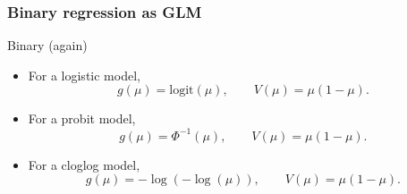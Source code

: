 \documentclass[handout]{beamer}
\newcommand{\logit}{\text{logit}}
\begin{document}

   \begin{frame} \frametitle{Binary regression as GLM}

   \begin{block}
      {Binary (again)}
      \begin{itemize}

      \item For a logistic model, $$g(\mu)=\logit(\mu), \qquad V(\mu)=\mu(1-\mu).$$

      \item For a probit model, $$g(\mu)=\Phi^{-1}(\mu), \qquad V(\mu)=\mu(1-\mu).$$

      \item For a cloglog model, $$g(\mu)=-\log(-\log(\mu)), \qquad V(\mu)=\mu(1-\mu).$$

      \end{itemize}
   \end{block}
   \end{frame}


   \begin{frame} 

   \end{frame}

   
\end{document}
